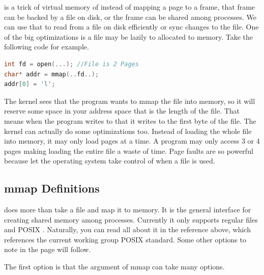 is a trick of virtual memory of instead of mapping a page to a frame, that frame can be backed by a file on disk, or the frame can be shared among processes.
We can use that to read from a file on disk efficiently or sync changes to the file.
One of the big optimizations is a file may be lazily to allocated to memory.
Take the following code for example.

\begin{lstlisting}[language=C]
int fd = open(...); //File is 2 Pages
char* addr = mmap(..fd..);
addr[0] = 'l';
\end{lstlisting}

The kernel sees that the program wants to mmap the file into memory, so it will reserve some space in your address space that is the length of the file.
That means when the program writes to  that it writes to the first byte of the file.
The kernel can actually do some optimizations too.
Instead of loading the whole file into memory, it may only load pages at a time.
A program may only access 3 or 4 pages making loading the entire file a waste of time.
Page faults are so powerful because let the operating system take control of when a file is used.

\subsection{mmap Definitions}

 does more than take a file and map it to memory.
It is the general interface for creating shared memory among processes.
Currently it only supports regular files and POSIX  \cite{mmap_2018}.
Naturally, you can read all about it in the reference above, which references the current working group POSIX standard.
Some other options to note in the page will follow.

The first option is that the  argument of mmap can take many options.

